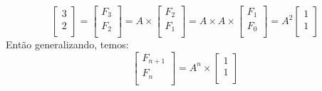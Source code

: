 \documentclass[10pt,a4paper]{article}
\begin{document}
\begin{equation}\nonumber
\begin{bmatrix}
3\\ 2\\
\end{bmatrix}=
\begin{bmatrix}
F_3\\ F_2\\
\end{bmatrix}=
A \times \begin{bmatrix}
F_2\\ F_1\\
\end{bmatrix}=
A \times A \times \begin{bmatrix}
F_1\\ F_0\\
\end{bmatrix}= A^2 \begin{bmatrix}
1\\ 1\\
\end{bmatrix}
\end{equation}
Então generalizando, temos:
\begin{equation}\nonumber
\begin{bmatrix}
F_{n+1}\\
F_{n}\\
\end{bmatrix}
=
A^n \times \begin{bmatrix}
       1\\ 1\\
\end{bmatrix}
\end{equation}
\end{document}
